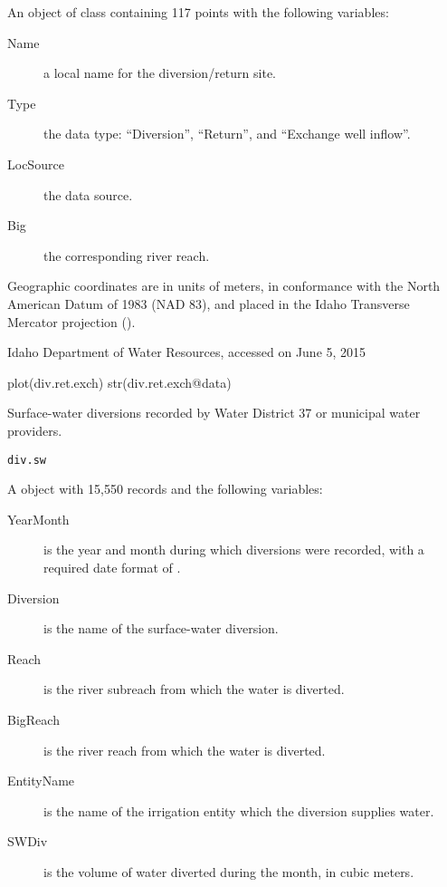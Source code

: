 \documentclass[a4paper]{book}
\begin{document}
\begin{Format}
An object of  class containing 117 points with the following variables:
\begin{description}

\item[Name] a local name for the diversion/return site.
\item[Type] the data type: ``Diversion'', ``Return'', and ``Exchange well inflow''.
\item[LocSource] the data source.
\item[Big] the corresponding river reach.

\end{description}

Geographic coordinates are in units of meters, in conformance with the North American Datum of 1983 (NAD 83), and placed in the
Idaho Transverse Mercator projection ().
\end{Format}
%
\begin{Source}\relax
Idaho Department of Water Resources, accessed on June 5, 2015
\end{Source}
%
\begin{Examples}
\begin{ExampleCode}
plot(div.ret.exch)
str(div.ret.exch@data)
\end{ExampleCode}
\end{Examples}
%
\begin{Description}\relax
Surface-water diversions recorded by Water District 37 or municipal water providers.
\end{Description}
%
\begin{Usage}
\begin{verbatim}
div.sw
\end{verbatim}
\end{Usage}
%
\begin{Format}
A  object with 15,550 records and the following variables:
\begin{description}

\item[YearMonth] is the year and month during which diversions were recorded, with a required date format of .
\item[Diversion] is the name of the surface-water diversion.
\item[Reach] is the river subreach from which the water is diverted.
\item[BigReach] is the river reach from which the water is diverted.
\item[EntityName] is the name of the irrigation entity which the diversion supplies water.
\item[SWDiv] is the volume of water diverted during the month, in cubic meters.

\end{description}

\end{Format}
\end{document}
